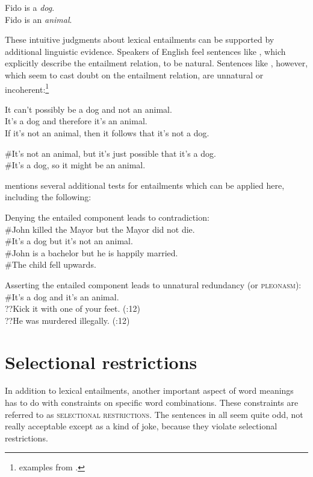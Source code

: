 \ea \label{ex:7.4}
\ea Fido is a \textit{dog}.\\
\ex Fido is an \textit{animal}.
                       \z
\z


These intuitive judgments about lexical entailments can be supported by additional linguistic evidence. Speakers of English feel sentences like , which explicitly describe the entailment relation, to be natural. Sentences like , however, which seem to cast doubt on the entailment relation, are unnatural or incoherent:\footnote{examples from \citet[14]{Cruse1986}.}


\ea \label{ex:7.5}
\ea It can’t possibly be a dog and not an animal.\\
\ex It’s a dog and therefore it’s an animal.\\
\ex If it’s not an animal, then it follows that it’s not a dog.
                       \z
\z

\ea \label{ex:7.6}
\ea \#It’s not an animal, but it’s just possible that it’s a dog.\\
\ex \#It’s a dog, so it might be an animal.
                       \z
\z


\citet[12]{Cruse1986} mentions several additional tests for entailments which can be applied here, including the following:


\ea
Denying the entailed component leads to contradiction:\\
\ea \#John killed the Mayor but the Mayor did not die.\\
\ex \#It’s a dog but it’s not an animal.\\
\ex \#John is a bachelor but he is happily married.\\
\ex \#The child fell upwards.
\z
                       \z

\ea
Asserting the entailed component leads to unnatural redundancy (or \textsc{pleonasm}):\\
\ea \#It’s a dog and it’s an animal.\\
\ex ??Kick it with one of your feet.  (\citealt{Cruse1986}:12)\\
\ex ??He was murdered illegally.  (\citealt{Cruse1986}:12)
                       \z
\z

\section{Selectional restrictions}\label{sec:} %

In addition to lexical entailments, another important aspect of word meanings has to do with constraints on specific word combinations. These constraints are referred to as \textsc{selectional restrictions}. The sentences in  all seem quite odd, not really acceptable except as a kind of joke, because they violate selectional restrictions.


